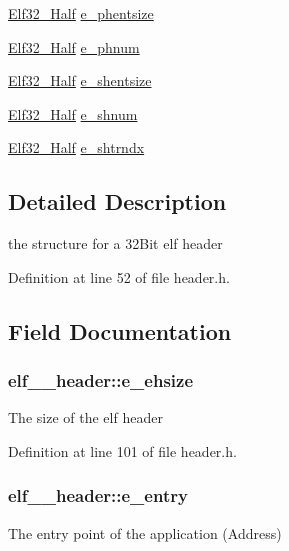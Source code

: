 \begin{DoxyCompactItemize}
\item 
\hyperlink{header_8h_a36b5c3e0acdf5b2949591cd07480d10b}{Elf32\_\-Half} \hyperlink{structelf__32__header_af679dc989e4b55d4b74806a1d2590187}{e\_\-phentsize}
\item 
\hyperlink{header_8h_a36b5c3e0acdf5b2949591cd07480d10b}{Elf32\_\-Half} \hyperlink{structelf__32__header_af0a0631bd17fedab7907fa3b057a1746}{e\_\-phnum}
\item 
\hyperlink{header_8h_a36b5c3e0acdf5b2949591cd07480d10b}{Elf32\_\-Half} \hyperlink{structelf__32__header_a8c6553a68b2f6ef39c613381b0dd1700}{e\_\-shentsize}
\item 
\hyperlink{header_8h_a36b5c3e0acdf5b2949591cd07480d10b}{Elf32\_\-Half} \hyperlink{structelf__32__header_a0b59b0c17c7d8676611fa95e6478085d}{e\_\-shnum}
\item 
\hyperlink{header_8h_a36b5c3e0acdf5b2949591cd07480d10b}{Elf32\_\-Half} \hyperlink{structelf__32__header_a4c98bca5dcfaea4cb18b26ba8942af72}{e\_\-shtrndx}
\end{DoxyCompactItemize}


\subsection{Detailed Description}
the structure for a 32Bit elf header 

Definition at line 52 of file header.h.



\subsection{Field Documentation}
\hypertarget{structelf__32__header_accab601e805e6f7088fcf56e50cde7d0}{
\subsubsection[{e\_\-ehsize}]{ {\bf elf\_\_\-header::e\_\-ehsize}}}
\label{structelf__32__header_accab601e805e6f7088fcf56e50cde7d0}
The size of the elf header 

Definition at line 101 of file header.h.

\hypertarget{structelf__32__header_a6c0fef788e2dc2043aa91b26429459bf}{
\subsubsection[{e\_\-entry}]{ {\bf elf\_\_\-header::e\_\-entry}}}
\label{structelf__32__header_a6c0fef788e2dc2043aa91b26429459bf}
The entry point of the application (Address) 

